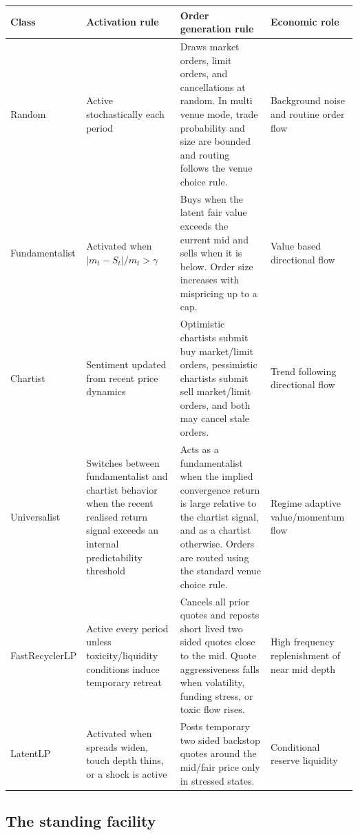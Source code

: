 \documentclass[a4paper,fleqn]{cas-sc}
\begin{document}
\begin{center}
\footnotesize
\begin{threeparttable}
\label{tab:agent_rules}
\begin{tabular}{p{2.4cm}p{3.1cm}p{6.2cm}p{2.4cm}}
\toprule
Class & Activation rule & Order generation rule & Economic role \\
\midrule
Random & Active stochastically each period & Draws market orders, limit orders, and cancellations at random. In multi venue mode, trade probability and size are bounded and routing follows the venue choice rule. & Background noise and routine order flow \\
Fundamentalist & Activated when \(|m_t-S_t|/m_t>\gamma\) & Buys when the latent fair value exceeds the current mid and sells when it is below. Order size increases with mispricing up to a cap. & Value based directional flow \\
Chartist & Sentiment updated from recent price dynamics & Optimistic chartists submit buy market/limit orders, pessimistic chartists submit sell market/limit orders, and both may cancel stale orders. & Trend following directional flow \\
Universalist & Switches between fundamentalist and chartist behavior when the recent realised return signal exceeds an internal predictability threshold & Acts as a fundamentalist when the implied convergence return is large relative to the chartist signal, and as a chartist otherwise. Orders are routed using the standard venue choice rule. & Regime adaptive value/momentum flow \\
FastRecyclerLP & Active every period unless toxicity/liquidity conditions induce temporary retreat & Cancels all prior quotes and reposts short lived two sided quotes close to the mid. Quote aggressiveness falls when volatility, funding stress, or toxic flow rises. & High frequency replenishment of near mid depth \\
LatentLP & Activated when spreads widen, touch depth thins, or a shock is active & Posts temporary two sided backstop quotes around the mid/fair price only in stressed states. & Conditional reserve liquidity \\
\bottomrule
\end{tabular}
\end{threeparttable}
\end{center}

\subsection{The standing facility}
\end{document}
